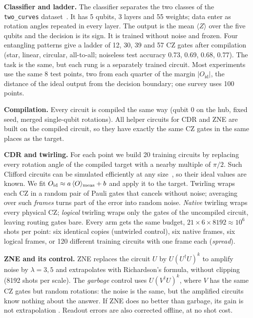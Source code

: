 \documentclass[aps,pra,twocolumn,superscriptaddress,nofootinbib,10pt]{revtex4-2}
\newcommand{\ev}[1]{\langle #1\rangle}
\newcommand{\Oid}{O_{\mathrm{id}}}
\begin{document}
\textbf{Classifier and ladder.} The classifier separates the two classes of the
\texttt{two\_curves} dataset~\cite{bowles2024}. It has 5 qubits, 3 layers and 55 weights;
data enter as rotation angles repeated in every layer. The output is the mean $\ev{Z}$ over
the five qubits and the decision is its sign. It is trained without noise and frozen. Four
entangling patterns give a ladder of 12, 30, 39 and 57 CZ gates after compilation (star,
linear, circular, all-to-all; noiseless test accuracy 0.73, 0.69, 0.68, 0.77). The task is
the same, but each rung is a separately trained circuit. Most experiments use the same 8 test
points, two from each quarter of the margin $|\Oid|$, the distance of the ideal output from
the decision boundary; one survey uses 100 points.

\textbf{Compilation.} Every circuit is compiled the same way (qubit 0 on the hub, fixed
seed, merged single-qubit rotations). All helper circuits for CDR and ZNE are built on the
compiled circuit, so they have exactly the same CZ gates in the same places as the target.

\textbf{CDR and twirling.} For each point we build 20 training circuits by replacing every
rotation angle of the compiled target with a nearby multiple of $\pi/2$. Such Clifford
circuits can be simulated efficiently at any size~\cite{gottesman1998,aaronson2004}, so their
ideal values are known. We fit $\Oid\approx a\,\ev{O}_{\rm meas}+b$ and apply it to the target.
Twirling wraps each CZ in a random pair of Pauli gates that cancels without noise; averaging
over such \emph{frames} turns part of the error into random noise. \emph{Native} twirling
wraps every physical CZ; \emph{logical} twirling wraps only the gates of the uncompiled
circuit, leaving routing gates bare. Every arm gets the same budget, $21\times6\times8192
\approx 10^6$ shots per point: six identical copies (untwirled control), six native frames,
six logical frames, or 120 different training circuits with one frame each (\emph{spread}).

\textbf{ZNE and its control.} ZNE replaces the circuit $U$ by $U(U^\dagger U)^k$ to amplify
noise by $\lambda=3,5$ and extrapolates with Richardson's formula, without clipping (8192 shots
per scale). The \emph{garbage} control uses $U(V^\dagger U)^k$, where $V$ has the same CZ
gates but random rotations: the noise is the same, but the amplified circuits know nothing
about the answer. If ZNE does no better than garbage, its gain is not extrapolation
\cite{koster2026}. Readout errors are also corrected offline, at no shot cost.
\end{document}
